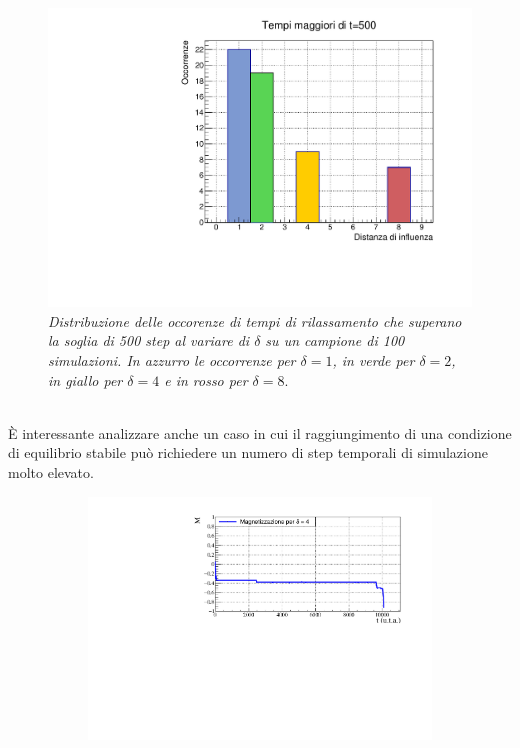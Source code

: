 \documentclass[letterpaper,10pt]{article}
\begin{document}
\medskip
\medskip
\\
\begin{figure}[h!!]
\centering
\includegraphics[width=0.85\linewidth]{Gravitazione/Time_distribution_correlation.pdf}
\caption{\textit{Distribuzione delle occorenze di tempi di rilassamento che superano la soglia di 500 step al variare di $\delta$ su un campione di 100 simulazioni. In azzurro le occorrenze per $\delta=1$, in verde per $\delta=2$, in giallo per $\delta=4$ e in rosso per $\delta=8$}.}
\label{Fig:19}
\end{figure}
\\
È interessante analizzare anche un caso in cui il raggiungimento di una condizione di equilibrio stabile può richiedere un numero di step temporali di simulazione molto elevato. 
\begin{figure}[h!]
\centering
\begin{subfigure}[h]{\linewidth}
\centering
\includegraphics[width=\linewidth]{Gravitazione/mag.pdf}
\end{subfigure}
\end{figure}
\end{document}
